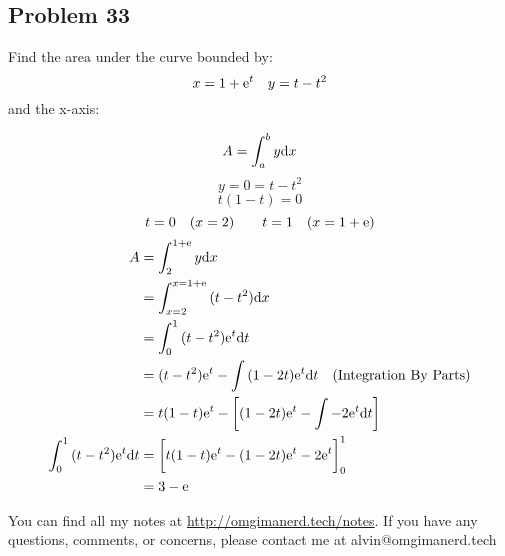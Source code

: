 \documentclass[letterpaper, 12pt]{math}
\begin{document}
\subsection*{Problem 33}
Find the area under the curve bounded by:
\[ x = 1+\mathrm{e}^{t} \quad y = t-t^{2} \]
and the x-axis:
\begin{center}
\end{center}
\[ A = \int_{a}^{b}{y\mathrm{d}{x}} \]
\[ y = 0 = t-t^{2} \]
\[ t(1-t) = 0 \]
\[ t = 0 \quad (x = 2) \quad \quad t = 1 \quad (x=1+\mathrm{e}) \]
\begin{align*}
  A &= \int_{2}^{1+\mathrm{e}}{y\mathrm{d}{x}} \\
  &= \int_{x=2}^{x=1+\mathrm{e}}{(t-t^{2})\mathrm{d}{x}} \\
  &= \int_{0}^{1}{(t-t^{2})\mathrm{e}^{t}\mathrm{d}{t}} \\
  &= (t-t^{2})\mathrm{e}^{t}-\int{(1-2t)\mathrm{e}^{t}\mathrm{d}{t}}
    \quad\mathrm{(Integration\ By\ Parts)} \\
  &= t(1-t)\mathrm{e}^{t}-\bigg[(1-2t)\mathrm{e}^{t}-\int{-2\mathrm{e}^{t}\mathrm{d}{t}}\bigg] \\
  \int_{0}^{1}{(t-t^{2})\mathrm{e}^{t}\mathrm{d}{t}} &=
    \bigg[t(1-t)\mathrm{e}^{t}-(1-2t)\mathrm{e}^{t}-2\mathrm{e}^{t}\bigg]_{0}^{1} \\
  &= 3-\mathrm{e}
\end{align*}

\begin{center}
  You can find all my notes at \url{http://omgimanerd.tech/notes}. If you have
  any questions, comments, or concerns, please contact me at
  alvin@omgimanerd.tech
\end{center}
\end{document}
